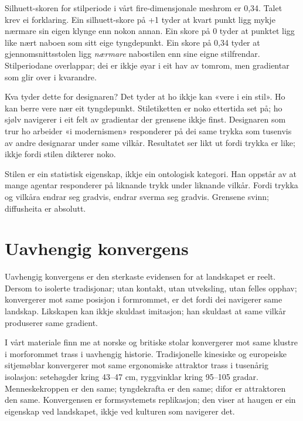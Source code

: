 Silhuett-skoren for stilperiode i vårt fire-dimensjonale meshrom er 0,34. Talet krev ei forklaring. Ein silhuett-skore på +1 tyder at kvart punkt ligg mykje nærmare sin eigen klynge enn nokon annan. Ein skore på 0 tyder at punktet ligg like nært naboen som sitt eige tyngdepunkt. Ein skore på 0,34 tyder at gjennomsnittsstolen ligg \textit{nærmare} nabostilen enn sine eigne stilfrendar. Stilperiodane overlappar; dei er ikkje øyar i eit hav av tomrom, men gradientar som glir over i kvarandre.

Kva tyder dette for designaren? Det tyder at ho ikkje kan «vere i ein stil». Ho kan berre vere nær eit tyngdepunkt. Stiletiketten er noko ettertida set på; ho sjølv navigerer i eit felt av gradientar der grensene ikkje finst. Designaren som trur ho arbeider «i modernismen» responderer på dei same trykka som tusenvis av andre designarar under same vilkår. Resultatet ser likt ut fordi trykka er like; ikkje fordi stilen dikterer noko.

Stilen er ein statistisk eigenskap, ikkje ein ontologisk kategori. Han oppstår av at mange agentar responderer på liknande trykk under liknande vilkår. Fordi trykka og vilkåra endrar seg gradvis, endrar sverma seg gradvis. Grensene svinn; diffusheita er absolutt.

\section*{Uavhengig konvergens}


Uavhengig konvergens er den sterkaste evidensen for at landskapet er reelt. Dersom to isolerte tradisjonar; utan kontakt, utan utveksling, utan felles opphav; konvergerer mot same posisjon i formrommet, er det fordi dei navigerer same landskap. Likskapen kan ikkje skuldast imitasjon; han skuldast at same vilkår produserer same gradient.

I vårt materiale finn me at norske og britiske stolar konvergerer mot same klustre i morforommet trass i uavhengig historie. Tradisjonelle kinesiske og europeiske sitjemøblar konvergerer mot same ergonomiske attraktor trass i tusenårig isolasjon: setehøgder kring 43--47 cm, ryggvinklar kring 95--105 gradar. Menneskekroppen er den same; tyngdekrafta er den same; difor er attraktoren den same. Konvergensen er formsystemets replikasjon; den viser at haugen er ein eigenskap ved landskapet, ikkje ved kulturen som navigerer det.

